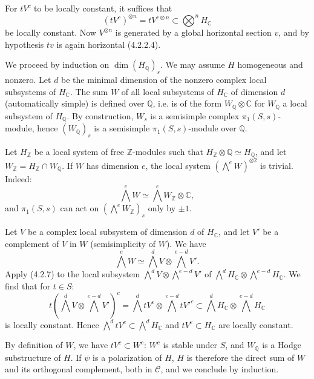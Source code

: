 \documentclass[10pt]{article}
\newcommand{\C}{\mathbb C}
\newcommand{\Q}{\mathbb Q}
\newcommand{\Z}{\mathbb Z}
\newcommand{\fg}{\guillemotright}
\newcommand{\og}{\guillemotleft}
\begin{document}
For $tV^c$ to be locally constant, it suffices that
\[
(tV^c)^{\otimes n}=tV^{c\otimes n}\subset\bigotimes^n H_\C
\]
be locally constant. Now $V^{\otimes n}$ is generated by a global horizontal section $v$, and by hypothesis $tv$ is again horizontal (4.2.2.4).

We proceed by induction on $\dim(H_\Q)_s$. We may assume $H$ homogeneous and nonzero. Let $d$ be the minimal dimension of the nonzero complex local subsystems of $H_\C$. The sum $W$ of all local subsystems of $H_\C$ of dimension $d$ (automatically simple) is \og defined over $\Q$\fg, i.e. is of the form $W_\Q\otimes\C$ for $W_\Q$ a local subsystem of $H_\Q$. By construction, $W_s$ is a semisimple complex $\pi_1(S,s)$-module, hence $(W_\Q)_s$ is a semisimple $\pi_1(S,s)$-module over $\Q$.

Let $H_\Z$ be a local system of free $\Z$-modules such that $H_\Z\otimes\Q\simeq H_\Q$, and let $W_\Z=H_\Z\cap W_\Q$. If $W$ has dimension $e$, the local system $(\bigwedge^e W)^{\otimes2}$ is trivial. Indeed:
\[
\bigwedge^e W\simeq \bigwedge^e W_\Z\otimes\C,
\]
and $\pi_1(S,s)$ can act on $(\bigwedge^eW_\Z)_s$ only by $\pm1$.

Let $V$ be a complex local subsystem of dimension $d$ of $H_\C$, and let $V'$ be a complement of $V$ in $W$ (semisimplicity of $W$). We have
\[
\bigwedge^e W\simeq \bigwedge^d V\otimes\bigwedge^{e-d}V'.
\]
Apply (4.2.7) to the local subsystem $\bigwedge^dV\otimes\bigwedge^{e-d}V'$ of $\bigwedge^dH_\C\otimes\bigwedge^{e-d}H_\C$. We find that for $t\in S$:
\[
t(\bigwedge^dV\otimes\bigwedge^{e-d}V')^c=
\bigwedge^d tV^c\otimes\bigwedge^{e-d}tV'^c
\subset \bigwedge^dH_\C\otimes\bigwedge^{e-d}H_\C
\]
is locally constant. Hence $\bigwedge^d tV^c\subset\bigwedge^dH_\C$ and $tV^c\subset H_\C$ are locally constant.

By definition of $W$, we have $tV^c\subset W^c$: $W^c$ is stable under $S$, and $W_\Q$ is a Hodge substructure of $H$. If $\psi$ is a polarization of $H$, $H$ is therefore the direct sum of $W$ and its orthogonal complement, both in $\mathcal C$, and we conclude by induction.
\end{document}
